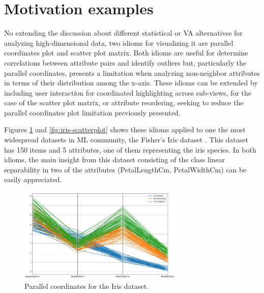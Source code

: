 \section{Motivation examples} %
\label{section1.1}

No extending the discussion about different statistical or VA alternatives for analyzing high-dimensional data, two idioms for visualizing it are parallel coordinates plot and scatter plot matrix. Both idioms are useful for determine correlations between attribute pairs and identify outliers but, particularly the parallel coordinates, presents a limitation when analyzing non-neighbor attributes in terms of their distribution among the x-axis. These idioms can be extended by including user interaction for coordinated highlighting across sub-views, for the case of the scatter plot matrix, or attribute reordering, seeking to reduce the parallel coordinates plot limitation previously presented.

Figures \ref{fig:iris-parallel} and \ref{fig:iris-scatterplot} shows these idioms applied to one the most widespread datasets in ML community, the Fisher's Iris dataset \cite{FisherIris}. This dataset has 150 items and 5 attributes, one of them representing the iris species. In both idioms, the main insight from this dataset consisting of the class linear separability in two of the attributes (PetalLengthCm, PetalWidthCm) can be easily appreciated.

\begin{figure}[ht]
 \centering
 \includegraphics[width=0.7\textwidth]{iris-parallel.png}
 \caption{Parallel coordinates for the Iris dataset.}
 \label{fig:iris-parallel}
\end{figure}

